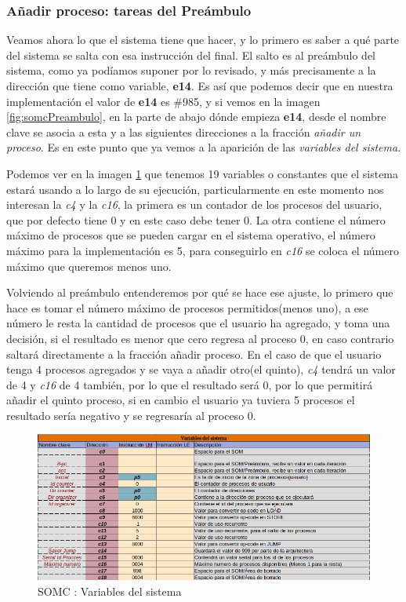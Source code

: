 \documentclass[letterpaper,12pt,oneside]{book}
\begin{document}
            \subsubsection{Añadir proceso: tareas del Preámbulo}
			
			Veamos ahora lo que el sistema tiene que hacer, y lo primero es saber a qué parte del sistema se salta con esa instrucción del final. El
			salto es al preámbulo del sistema, como ya podíamos suponer por lo revisado, y más precisamente a la dirección que tiene como variable,
			\textbf{e14}. Es así que podemos decir que en nuestra implementación el valor de \textbf{e14} es \#985, y si vemos en la imagen
			\ref{fig:somcPreambulo}, en la parte de abajo dónde empieza \textbf{e14}, desde el nombre clave  se asocia a esta y a las siguientes
			direcciones a la fracción \textit{añadir un proceso}. Es en este punto que ya vemos a la aparición de las \textit{variables del sistema}.
			
			Podemos ver en la imagen \ref{fig:somcVariablesSis} que tenemos 19 variables o constantes que el sistema estará usando a lo largo
			de su ejecución, particularmente en este momento nos interesan la \textit{c4} y la \textit{c16}, la primera es un contador de los 
			procesos del usuario, que por defecto tiene 0 y en este caso debe tener 0. La otra contiene el número máximo
			de procesos que se pueden cargar en el sistema operativo, el número máximo para la implementación es 5, para conseguirlo en
            \textit{c16} se coloca el número máximo que queremos menos uno.
   
            Volviendo al preámbulo entenderemos por qué se hace ese ajuste, lo primero que hace
			es tomar el número máximo de procesos permitidos(menos uno), a ese número le resta la cantidad
			de procesos que el usuario ha agregado, y toma una decisión, si el resultado es menor que cero regresa al proceso 0, en caso
			contrario saltará directamente a la fracción añadir proceso. En el caso de que el usuario tenga 4 procesos agregados y se vaya a añadir otro(el quinto),
			\textit{c4} tendrá un valor de 4 y \textit{c16} de 4 también, por lo que el resultado será 0, por lo que permitirá añadir el quinto proceso, si en
			cambio el usuario ya tuviera 5 procesos el resultado sería negativo y se regresaría al proceso 0.
			
						
			
			\begin{figure}[h]		
			\centering
			\includegraphics[scale=0.56]{media/CARDIACC/VariablesDelSistema.png}
			\caption{SOMC : Variables del sistema}
			\label{fig:somcVariablesSis}
		\end{figure}
\end{document}
